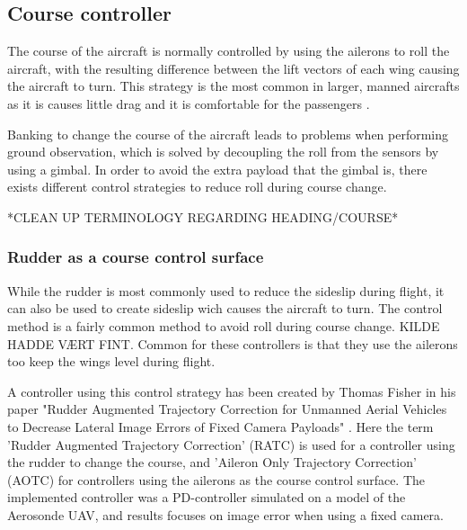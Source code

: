 \subsection{Course controller}
The course of the aircraft is normally controlled by using the ailerons to roll the aircraft, with the resulting difference between the lift vectors of each wing causing the aircraft to turn. This strategy is the most common in larger, manned aircrafts as it is causes little drag and it is comfortable for the passengers \cite{skidToTurnMills}.

Banking to change the course of the aircraft leads to problems when performing ground observation, which is solved by decoupling the roll from the sensors by using a gimbal. In order to avoid the extra payload that the gimbal is, there exists different control strategies to reduce roll during course change.

*CLEAN UP TERMINOLOGY REGARDING HEADING/COURSE*


\subsubsection{Rudder as a course control surface}
While the rudder is most commonly used to reduce the sideslip during flight, it can also be used to create sideslip wich causes the aircraft to turn. The control method is a fairly common method to avoid roll during course change. KILDE HADDE VÆRT FINT. Common for these controllers is that they use the ailerons too keep the wings level during flight.

A controller using this control strategy has been created by Thomas Fisher in his paper "Rudder Augmented Trajectory Correction for
Unmanned Aerial Vehicles to Decrease Lateral Image Errors of Fixed Camera Payloads" \cite{ratcFISHER}. Here the term 'Rudder Augmented Trajectory Correction' (RATC) is used for a controller using the rudder to change the course, and 'Aileron Only Trajectory Correction' (AOTC) for controllers using the ailerons as the course control surface. The implemented controller was a PD-controller simulated on a model of the Aerosonde UAV, and results focuses on image error when using a fixed camera.


